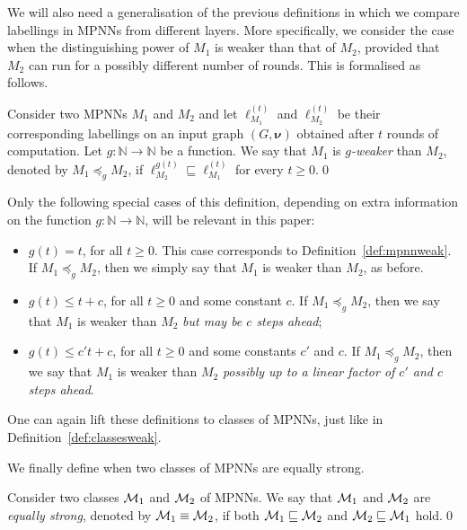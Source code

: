 
We will also need a generalisation of the previous definitions in which we compare labellings in MPNNs from different layers. 
More specifically, we consider the case when the distinguishing power of $M_1$ is weaker than that of $M_2$, provided that $M_2$ can run for a possibly different number of rounds.
This is formalised as follows.

\begin{definition}\normalfont
Consider two MPNNs $M_1$ and $M_2$ and let $\pmb{\ell}_{M_1}^{(t)}$ and $\pmb{\ell}_{M_2}^{(t)}$  be their corresponding labellings on an input graph $( G,\pmb{\nu})$ obtained after $t$ rounds of computation. Let $g:\mathbb{N}\to \mathbb{N}$ be a function. We say that $M_1$ is \textit{$g$-weaker} than $M_2$, denoted by $M_1\preceq_{g} M_2$, if 
$\pmb{\ell}_{M_2}^{g(t)}\sqsubseteq
\pmb{\ell}_{M_1}^{(t)}$ for every $t\geq 0$.\qed
\end{definition}

Only the following special cases of this definition, depending on extra information on the function $g:\mathbb{N}\to\mathbb{N}$, will be relevant in this paper:
\begin{itemize}
    \item $g(t)=t$, for all $t\geq 0$. This case corresponds to Definition~\ref{def:mpnnweak}. If $M_1\preceq_{g} M_2$, then we simply say that $M_1$ is weaker than $M_2$, as before.
    \item $g(t)\leq t+c$, for all $t\geq 0$ and some constant $c$. If $M_1\preceq_{g} M_2$, then we say that $M_1$ is weaker than $M_2$ \textit{but may be $c$ steps ahead};
    \item $g(t)\leq c't+c$, for all $t\geq 0$ and some constants $c'$ and $c$. If $M_1\preceq_{g} M_2$, then we say that $M_1$ is weaker than $M_2$ \textit{possibly up to a linear factor of $c'$ and $c$ steps ahead}.
\end{itemize}

One can again lift these definitions to classes of MPNNs, just like in Definition~\ref{def:classesweak}.

We finally define when two classes of MPNNs are equally strong.
\begin{definition}\normalfont
Consider two classes $\mathcal{M}_1$ and $\mathcal{M}_2$ of MPNNs. We say that 
$\mathcal{M}_1$ and $\mathcal{M}_2$ are \textit{equally strong}, denoted by $\mathcal{M}_1\equiv \mathcal{M}_2$, if 
both  $\mathcal{M}_1\sqsubseteq \mathcal{M}_2$ 
and  $\mathcal{M}_2\sqsubseteq \mathcal{M}_1$ hold.\qed\end{definition}

